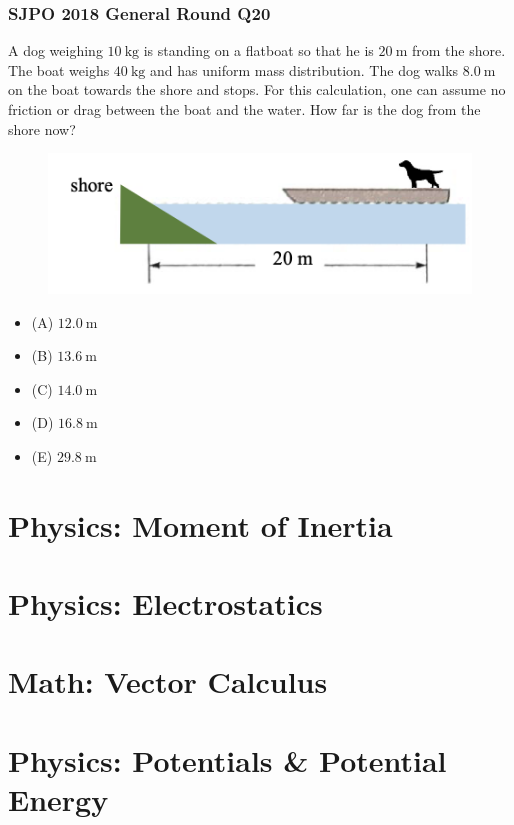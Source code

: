 \documentclass{article}
\begin{document}
\subsubsection{SJPO 2018 General Round Q20}
A dog weighing $10 \mathrm{~kg}$ is standing on a flatboat so that he is $20 \mathrm{~m}$ from the shore. The boat weighs $40 \mathrm{~kg}$ and has uniform mass distribution. The dog walks $8.0 \mathrm{~m}$ on the boat towards the shore and stops. For this calculation, one can assume no friction or drag between the boat and the water. How far is the dog from the shore now? \\
{
\begin{figure}
\includegraphics[width=1.0\linewidth]{images/sjpo2018q20.png}
\end{figure}
\begin{itemize}
\item[] (A) $12.0 \mathrm{~m}$
\item[] (B) $13.6 \mathrm{~m}$
\item[] (C) $14.0 \mathrm{~m}$
\item[] (D) $16.8 \mathrm{~m}$
\item[] (E) $29.8 \mathrm{~m}$
\end{itemize}
}
\clearpage


\section{Physics: Moment of Inertia}
\section{Physics: Electrostatics}

\section{Math: Vector Calculus}
\clearpage
\section{Physics: Potentials \& Potential Energy}
\end{document}
